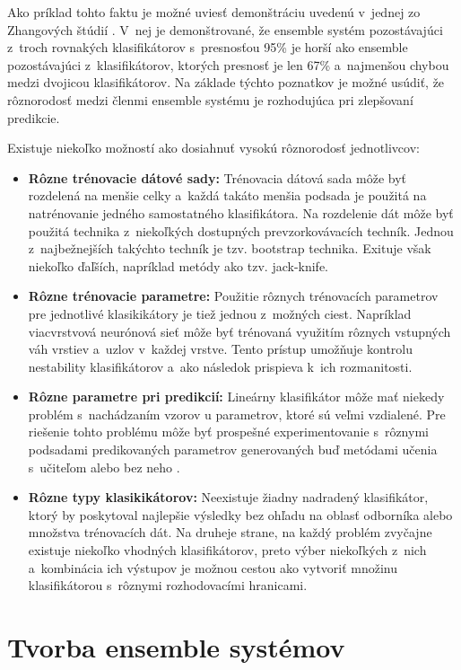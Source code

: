 Ako príklad tohto faktu je možné uviesť demonštráciu uvedenú v~jednej zo Zhangových štúdií \cite{zhang}. V~nej je demonštrované, že ensemble systém pozostávajúci z~troch rovnakých klasifikátorov s~presnosťou 95\% je horší ako ensemble pozostávajúci z~klasifikátorov, ktorých presnosť je len 67\% a~najmenšou chybou medzi dvojicou klasifikátorov. Na základe týchto poznatkov je možné usúdiť, že rôznorodosť medzi členmi ensemble systému je rozhodujúca pri zlepšovaní predikcie.

Existuje niekoľko možností ako dosiahnuť vysokú rôznorodosť jednotlivcov:
\begin{itemize}
	\item \textbf{Rôzne trénovacie dátové sady:} Trénovacia dátová sada môže byť rozdelená na menšie celky a~každá takáto menšia podsada je použitá na natrénovanie jedného samostatného klasifikátora. Na rozdelenie dát môže byť použitá technika z~niekoľkých dostupných prevzorkovávacích techník. Jednou z~najbežnejších takýchto techník je tzv. bootstrap technika. Exituje však niekoľko ďaľších, napríklad metódy ako tzv. jack-knife.
	\item \textbf{Rôzne trénovacie parametre:} Použitie rôznych trénovacích parametrov pre jednotlivé klasikikátory je tiež jednou z~možných ciest. Napríklad viacvrstvová neurónová sieť môže byť trénovaná využitím rôznych vstupných váh vrstiev a~uzlov v~každej vrstve. Tento prístup umožňuje kontrolu nestability klasifikátorov a~ako následok prispieva k~ich rozmanitosti. 	
	\item \textbf{Rôzne parametre pri predikcií:} Lineárny klasifikátor môže mať niekedy problém s~nachádzaním vzorov u parametrov, ktoré sú veľmi vzdialené. Pre riešenie tohto problému môže byť prospešné experimentovanie s~rôznymi podsadami predikovaných parametrov generovaných buď metódami učenia s~učiteľom alebo bez neho \cite{dataclas}.	
	\item \textbf{Rôzne typy klasikikátorov:} Neexistuje žiadny nadradený klasifikátor, ktorý by poskytoval najlepšie výsledky bez ohľadu na oblasť odborníka alebo množstva trénovacích dát. Na druheje strane, na každý problém zvyčajne existuje niekoľko vhodných klasifikátorov, preto výber niekoľkých z~nich a~kombinácia ich výstupov je možnou cestou ako vytvoriť množinu klasifikátorou s~rôznymi rozhodovacími hranicami.
\end{itemize}

\newpage
\section{Tvorba ensemble systémov}

